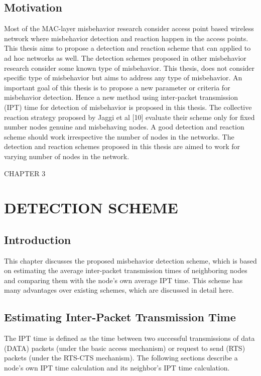 \documentclass[12pt,letterpaper,english]{article}
\begin{document}
\subsection{Motivation}
\indent Most of the MAC-layer misbehavior research consider access point based wireless network where misbehavior detection and reaction happen in the access points. This thesis aims to propose a detection and reaction scheme that can applied to ad hoc networks as well. 
The detection schemes proposed in other misbehavior research consider some known type of misbehavior. This thesis, does not consider specific type of misbehavior but aims to address any type of misbehavior. 
An important goal of this thesis is to propose a new parameter or criteria for misbehavior detection. Hence a new method using inter-packet transmission (IPT) time for detection of misbehavior is proposed in this thesis.
The collective reaction strategy proposed by Jaggi et al 
[10] 
evaluate their scheme only for fixed number nodes genuine and misbehaving nodes. A good detection and reaction scheme should work irrespective the number of nodes in the networks. The detection and reaction schemes proposed in this thesis are aimed to work for varying number of nodes in the network.
\newpage
\setcounter{figure}{0}
\setcounter{table}{0}
\setcounter{subsection}{0}
\begin{singlespace}
\begin{center}
CHAPTER 3
\section*{DETECTION SCHEME}
\addtocounter{section}{1}
\label{chapter:detection}
\end{center}
\end{singlespace}
\subsection{Introduction}
\indent This chapter discusses the proposed misbehavior detection scheme, which is based on estimating the average inter-packet transmission times of neighboring nodes and comparing them with the node's own average IPT time. This scheme has many advantages over existing schemes, which are discussed in detail here.
\subsection{Estimating Inter-Packet Transmission Time}
\indent The IPT time is defined as the time between two successful transmissions of data (DATA) packets (under the basic access mechanism) or request to send (RTS) packets (under the RTS-CTS mechanism). The following sections describe a node's own IPT time calculation and its neighbor's IPT time calculation.
\end{document}
